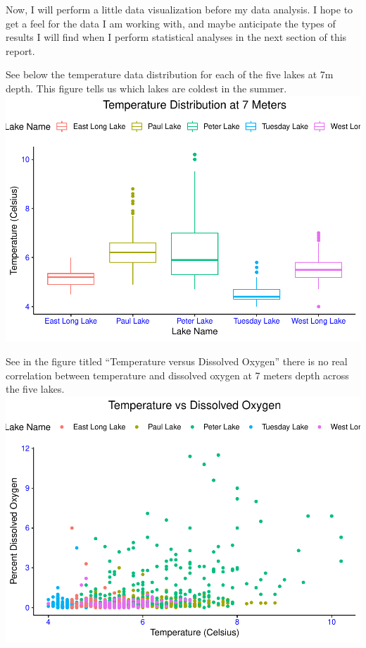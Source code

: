 \documentclass[12pt,]{article}
\begin{document}
Now, I will perform a little data visualization before my data analysis.
I hope to get a feel for the data I am working with, and maybe
anticipate the types of results I will find when I perform statistical
analyses in the next section of this report.

See below the temperature data distribution for each of the five lakes
at 7m depth. This figure tells us which lakes are coldest in the summer.
\includegraphics{Bollt_ENV872_FinalProject_files/figure-latex/visualization-1.pdf}

See in the figure titled ``Temperature versus Dissolved Oxygen'' there
is no real correlation between temperature and dissolved oxygen at 7
meters depth across the five lakes.
\includegraphics{Bollt_ENV872_FinalProject_files/figure-latex/visualization2-1.pdf}
\end{document}
